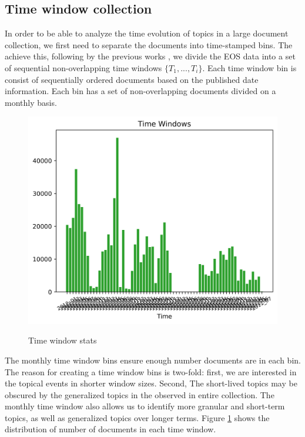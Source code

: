 \subsection{Time window collection}
In order to be able to analyze the time evolution of topics in a large document collection, we first need to separate the documents into time-stamped bins. The achieve this, following by the previous works \cite{Sulo2010}, we divide the EOS data into a set of sequential non-overlapping time windows $\{T_1, ... , T_i\}$. Each time window bin is consist of sequentially ordered documents based on the published date information. Each bin has a set of non-overlapping documents divided on a monthly basis. 

\begin{figure}[t]
\caption{Time window stats}
\includegraphics[scale=.8]{img/windows_corpus_info_2016_2017.png}
\centering
\label{fig:corpus_windows}
\end{figure}

The monthly time window bins ensure enough number documents are in each bin. The reason for creating a time window bins is two-fold: first, we are interested in the topical events in shorter window sizes. Second, The short-lived topics may be obscured by the generalized topics in the observed in entire collection. The monthly time window also allows us to identify more granular and short-term topics, as well as generalized topics over longer terms. Figure \ref{fig:corpus_windows} shows the distribution of number of documents in each time window. 




